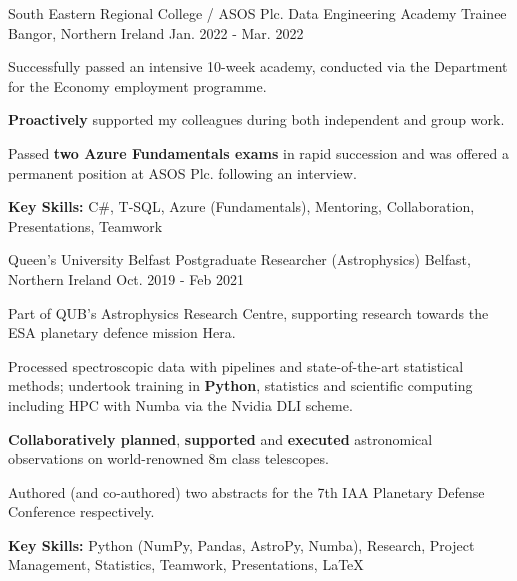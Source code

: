 \begin{cventries}
  \cventry
  	{South Eastern Regional College / ASOS Plc.} %
    {Data Engineering Academy Trainee} %
    {Bangor, Northern Ireland} %
    {Jan. 2022 - Mar. 2022} %
    {
      \begin{cvitems} %
        \item {Successfully passed an intensive 10-week academy, conducted via the Department for the Economy employment programme.}
        \item {\textbf{Proactively} supported my colleagues during both independent and group work.}
        \item {Passed \textbf{two Azure Fundamentals exams} in rapid succession and was offered a permanent position at ASOS Plc. following an interview.}
        \item {\textbf{Key Skills:} C\#, T-SQL, Azure (Fundamentals), Mentoring, Collaboration, Presentations, Teamwork}
      \end{cvitems}
    }

  \cventry
    {Queen's University Belfast} %
    {Postgraduate Researcher (Astrophysics)} %
    {Belfast, Northern Ireland} %
    {Oct. 2019 - Feb 2021} %
    {
      \begin{cvitems} %
        \item {Part of QUB's Astrophysics Research Centre, supporting research towards the ESA planetary defence mission Hera.}
        \item {Processed spectroscopic data with pipelines and state-of-the-art statistical methods; undertook training in \textbf{Python}, statistics and scientific computing including HPC with Numba via the Nvidia DLI scheme.}
        \item {\textbf{Collaboratively planned}, \textbf{supported} and \textbf{executed} astronomical observations on world-renowned 8m class telescopes.}
        \item {Authored (and co-authored) two abstracts for the 7th IAA Planetary Defense Conference respectively.}
        \item {\textbf{Key Skills:} Python (NumPy, Pandas, AstroPy, Numba), Research, Project Management, Statistics, Teamwork, Presentations, \LaTeX}
      \end{cvitems}
    }
    

\end{cventries}
